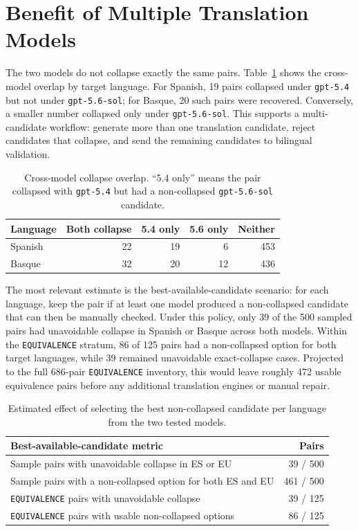 \documentclass[10pt]{article}
\begin{document}
\section{Benefit of Multiple Translation Models}

The two models do not collapse exactly the same pairs.  Table~\ref{tab:overlap}
shows the cross-model overlap by target language.  For Spanish, 19 pairs
collapsed under \texttt{gpt-5.4} but not under \texttt{gpt-5.6-sol}; for Basque,
20 such pairs were recovered.  Conversely, a smaller number collapsed only under
\texttt{gpt-5.6-sol}.  This supports a multi-candidate workflow: generate more
than one translation candidate, reject candidates that collapse, and send the
remaining candidates to bilingual validation.

\begin{table}[h]
\centering
\small
\begin{tabular}{lrrrr}
\toprule
Language & Both collapse & 5.4 only & 5.6 only & Neither \\
\midrule
Spanish & 22 & 19 & 6 & 453 \\
Basque & 32 & 20 & 12 & 436 \\
\bottomrule
\end{tabular}
\caption{Cross-model collapse overlap.  ``5.4 only'' means the pair collapsed
with \texttt{gpt-5.4} but had a non-collapsed \texttt{gpt-5.6-sol} candidate.}
\label{tab:overlap}
\end{table}

The most relevant estimate is the best-available-candidate scenario: for each
language, keep the pair if at least one model produced a non-collapsed candidate
that can then be manually checked.  Under this policy, only 39 of the 500
sampled pairs had unavoidable collapse in Spanish or Basque across both models.
Within the \texttt{EQUIVALENCE} stratum, 86 of 125 pairs had a non-collapsed
option for both target languages, while 39 remained unavoidable exact-collapse
cases.  Projected to the full 686-pair \texttt{EQUIVALENCE} inventory, this
would leave roughly 472 usable equivalence pairs before any additional
translation engines or manual repair.

\begin{table}[h]
\centering
\small
\begin{tabular}{lr}
\toprule
Best-available-candidate metric & Pairs \\
\midrule
Sample pairs with unavoidable collapse in ES or EU & 39 / 500 \\
Sample pairs with a non-collapsed option for both ES and EU & 461 / 500 \\
\texttt{EQUIVALENCE} pairs with unavoidable collapse & 39 / 125 \\
\texttt{EQUIVALENCE} pairs with usable non-collapsed options & 86 / 125 \\
\bottomrule
\end{tabular}
\caption{Estimated effect of selecting the best non-collapsed candidate per
language from the two tested models.}
\label{tab:best}
\end{table}
\end{document}
